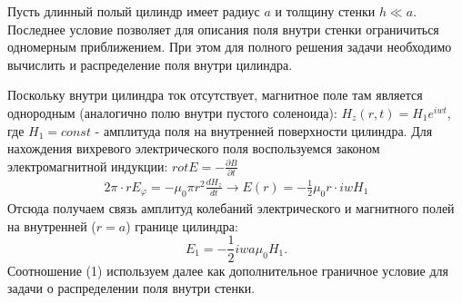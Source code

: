 \documentclass[a4paper,12pt]{report}
\begin{document}
Пусть длинный полый цилиндр имеет радиус $a$ и толщину стенки $h \ll a$. Последнее условие позволяет для описания поля внутри стенки ограничиться одномерным приближением. При этом для полного решения задачи необходимо вычислить и распределение поля внутри цилиндра.

Поскольку внутри цилиндра ток отсутствует, магнитное поле там является однородным (аналогично полю внутри пустого соленоида): \(H_{z}(r,t) = H_{1} e^{iwt}\), где \(H_{1}=const\) - амплитуда поля на внутренней поверхности цилиндра. Для нахождения вихревого электрического поля воспользуемся законом электромагнитной индукции: \(rot E = -\frac{\partial B}{\partial t}\)
\begin{gather*}
    2\pi\cdot rE_{\varphi} = -\mu_{0}\pi r^2\frac{dH_{z}}{dt} \rightarrow
    E(r) = -\frac{1}{2}\mu_{0}r\cdot iwH_{1}
\end{gather*}
Отсюда получаем связь амплитуд колебаний электрического и магнитного полей на внутренней (\(r=a\)) границе цилиндра:
\begin{equation}
    E_{1} = -\frac{1}{2}iwa\mu_{0}H_{1}.
\end{equation}
Соотношение (1) используем далее как дополнительное граничное условие для задачи о распределении поля внутри стенки.
\end{document}
